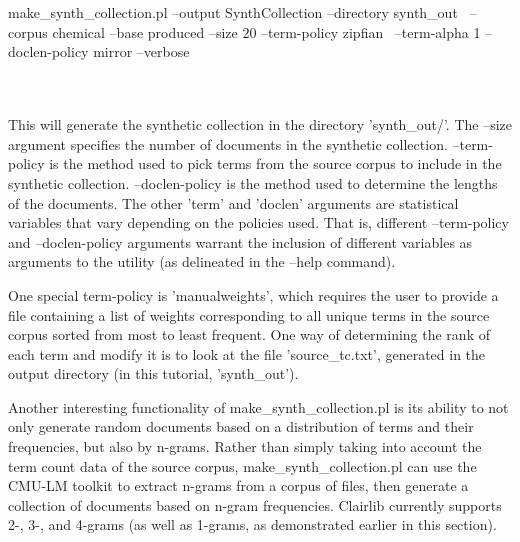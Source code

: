 \\
\\
\begin{boxedverbatim}
make_synth_collection.pl --output SynthCollection --directory synth_out \
 --corpus chemical --base produced --size 20 --term-policy zipfian \
 --term-alpha 1 --doclen-policy mirror --verbose
\end{boxedverbatim}
\\
\\
This will generate the synthetic collection in the directory 'synth\_out/'. The --size argument specifies the number of documents in the synthetic collection. --term-policy is the method used to pick terms from the source corpus to include in the synthetic collection. --doclen-policy is the method used to determine the lengths of the documents. The other 'term' and 'doclen' arguments are statistical variables that vary depending on the policies used. That is, different --term-policy and --doclen-policy arguments warrant the inclusion of different variables as arguments to the utility (as delineated in the --help command).

One special term-policy is 'manualweights', which requires the user to provide a file containing a list of weights corresponding to all unique terms in the source corpus sorted from most to least frequent. One way of determining the rank of each term and modify it is to look at the file 'source\_tc.txt', generated in the output directory (in this tutorial, 'synth\_out').

Another interesting functionality of make\_synth\_collection.pl is its ability to not only generate random documents based on a distribution of terms and their frequencies, but also by n-grams. Rather than simply taking into account the term count data of the source corpus, make\_synth\_collection.pl can use the CMU-LM toolkit to extract n-grams from a corpus of files, then generate a collection of documents based on n-gram frequencies. Clairlib currently supports 2-, 3-, and 4-grams (as well as 1-grams, as demonstrated earlier in this section).

